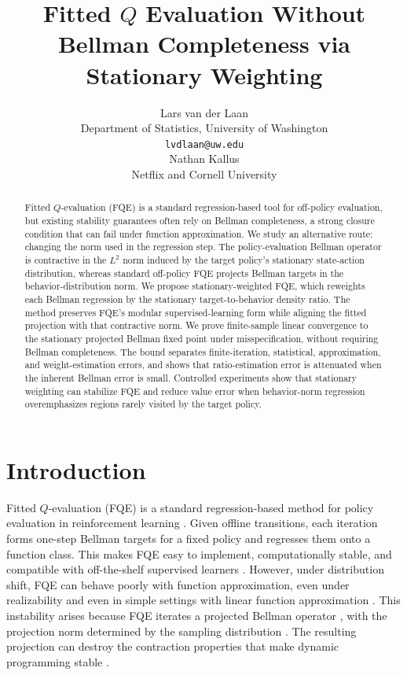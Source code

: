 \documentclass{article}
\title{Fitted $Q$ Evaluation Without Bellman Completeness via Stationary Weighting}
\author{%
  Lars van der Laan \\
  Department of Statistics, University of Washington \\
  \texttt{lvdlaan@uw.edu} \\
  \And
  Nathan Kallus \\
  Netflix and Cornell University
}
\theoremstyle{plain}
\theoremstyle{definition}
\theoremstyle{remark}
\begin{document}
\maketitle

\begin{abstract}
Fitted \(Q\)-evaluation (FQE) is a standard regression-based tool for
off-policy evaluation, but existing stability guarantees often rely on Bellman
completeness, a strong closure condition that can fail under function
approximation. We study an alternative route: changing the norm used in the
regression step. The policy-evaluation Bellman operator is contractive in the
\(L^2\) norm induced by the target policy's stationary state-action
distribution, whereas standard off-policy FQE projects Bellman targets in the
behavior-distribution norm. We propose stationary-weighted FQE, which reweights
each Bellman regression by the stationary target-to-behavior density ratio. The method preserves FQE's modular supervised-learning form while aligning the
fitted projection with that contractive norm. We
prove finite-sample linear convergence to the stationary projected Bellman fixed
point under misspecification, without requiring Bellman completeness. The bound
separates finite-iteration, statistical, approximation, and weight-estimation
errors, and shows that ratio-estimation error is attenuated when the inherent
Bellman error is small. Controlled experiments show that stationary weighting
can stabilize FQE and reduce value error when behavior-norm regression
overemphasizes regions rarely visited by the target policy.
\end{abstract}



\section{Introduction}
Fitted \(Q\)-evaluation (FQE) is a standard regression-based method for policy
evaluation in reinforcement learning
\citep{tsitsiklis1996analysis,gordon1995stable,lagoudakis2003least,ernst2005tree,
munos2005error,munos2008finite,farahmand2010error,bertsekas2011approximate}.
Given offline transitions, each iteration forms one-step Bellman targets for a
fixed policy and regresses them onto a function class. This makes FQE easy to
implement, computationally stable, and compatible with off-the-shelf supervised
learners
\citep{voloshin2019empirical,fujimoto2019off,le2019batch,agarwal2021deep}. However, under distribution shift, FQE
can behave poorly with function approximation, even under realizability and even
in simple settings with linear function approximation
\citep{baird1995residual,gordon1995stable}. This instability arises because FQE
iterates a projected Bellman operator
\citep{tsitsiklis1996analysis,meyn2024projected,lim2025understanding}, with the projection norm
determined by the sampling distribution
\citep{munos2008finite}. The resulting
projection can destroy the contraction properties that make dynamic programming
stable
\citep{bellman1952theory}.
\end{document}
